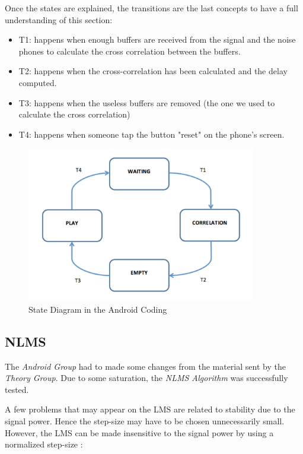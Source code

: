 \documentclass[11pt,a4paper,english]{book}  %
\theoremstyle{definition}  %
\theoremstyle{plain}  %
\theoremstyle{remark}  %
\begin{document}
		Once the states are explained, the transitions are the last concepts to have a full understanding of this section:
		
		\begin{itemize}
		\item T1: happens when enough buffers are received from the signal and the noise phones to calculate the cross correlation between the buffers.
		\item T2: happens when the cross-correlation has been calculated and the delay computed.
		\item T3: happens when the useless buffers are removed (the one we used to calculate the cross correlation)
		\item T4: happens when someone tap the button "reset" on the phone’s screen.
		\end{itemize}


		\begin{figure}[h]
		\centering
		\includegraphics[width=10cm]{images/android/states}
		\caption{State Diagram in the Android Coding}
		\label{fig:states}
		\end{figure}	
		
		
		\subsection{NLMS}
		
		The \textit{Android Group} had to made some changes from the material sent by the \textit{Theory Group}. Due to some saturation, the \textit{NLMS Algorithm} was successfully tested.
		
		A few problems that may appear on the LMS are related to stability due to the signal power. Hence the step-size may have to be chosen unnecessarily small. However, the LMS can be made insensitive to the signal power by using a normalized step-size \cite{asp}:
		
\end{document}
